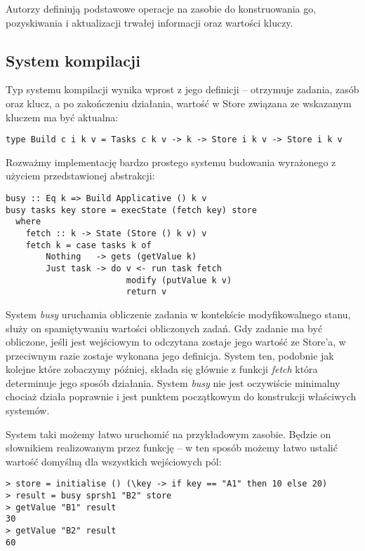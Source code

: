 Autorzy definiują podstawowe operacje na zasobie do konstruowania go, pozyskiwania i aktualizacji trwałej informacji oraz wartości kluczy.

\subsection{System kompilacji}

Typ systemu kompilacji wynika wprost z jego definicji -- otrzymuje zadania, zasób oraz klucz, a po zakończeniu działania, wartość w Store związana ze wskazanym kluczem ma być aktualna:

\begin{lstlisting}
type Build c i k v = Tasks c k v -> k -> Store i k v -> Store i k v
\end{lstlisting}

Rozważmy implementację bardzo prostego systemu budowania wyrażonego z użyciem przedstawionej abstrakcji:

\begin{lstlisting}
busy :: Eq k => Build Applicative () k v
busy tasks key store = execState (fetch key) store
  where
    fetch :: k -> State (Store () k v) v
    fetch k = case tasks k of
        Nothing   -> gets (getValue k)
        Just task -> do v <- run task fetch
                        modify (putValue k v)
                        return v
\end{lstlisting}

System \textit{busy} uruchamia obliczenie zadania w kontekście modyfikowalnego stanu, służy on spamiętywaniu wartości obliczonych zadań. Gdy zadanie ma być obliczone, jeśli jest wejściowym to odczytana zostaje jego wartość ze Store'a, w przeciwnym razie zostaje wykonana jego definicja. System ten, podobnie jak kolejne które zobaczymy później, składa się głównie z funkcji \textit{fetch} która determinuje jego sposób działania. System \textit{busy} nie jest oczywiście minimalny chociaż działa poprawnie i jest punktem początkowym do konstrukcji właściwych systemów.

System taki możemy łatwo uruchomić na przykładowym zasobie. Będzie on słownikiem realizowanym przez funkcję -- w ten sposób możemy łatwo ustalić wartość domyślną dla wszystkich wejściowych pól:

\begin{lstlisting}
> store = initialise () (\key -> if key == "A1" then 10 else 20)
> result = busy sprsh1 "B2" store
> getValue "B1" result
30
> getValue "B2" result
60
\end{lstlisting}

